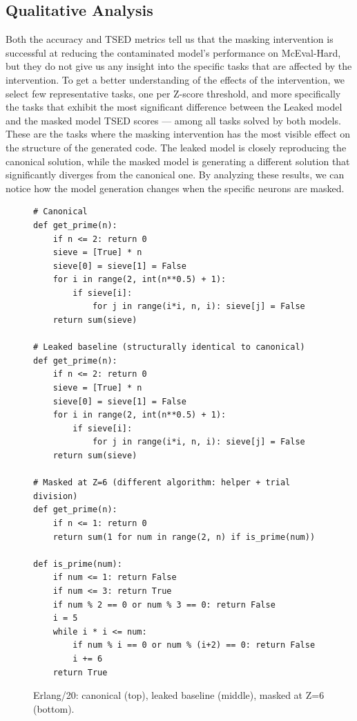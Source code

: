 \documentclass[mscthesis]{usiinfthesis}
\begin{document}
\subsection{Qualitative Analysis}
Both the accuracy and TSED metrics tell us that the masking intervention is successful
at reducing the contaminated model's performance on McEval-Hard, but they do not give us
any insight into the specific tasks that are affected by the intervention.
To get a better understanding of the effects of the intervention, we select few representative
tasks, one per Z-score threshold, and more specifically the tasks that exhibit the most significant
difference between the Leaked model and the masked model TSED scores --- among all tasks solved by both models.
These are the tasks where the masking intervention has the most visible effect on the structure of the generated code.
The leaked model is closely reproducing the canonical solution, while the masked model is
generating a different solution that significantly diverges from the canonical one.
By analyzing these results, we can notice how the model generation changes when the specific neurons
are masked.
\begin{figure}[h]
\begin{lstlisting}[style=pythonstyle2]
# Canonical
def get_prime(n):
    if n <= 2: return 0
    sieve = [True] * n
    sieve[0] = sieve[1] = False
    for i in range(2, int(n**0.5) + 1):
        if sieve[i]:
            for j in range(i*i, n, i): sieve[j] = False
    return sum(sieve)
 
# Leaked baseline (structurally identical to canonical)
def get_prime(n):
    if n <= 2: return 0
    sieve = [True] * n
    sieve[0] = sieve[1] = False
    for i in range(2, int(n**0.5) + 1):
        if sieve[i]:
            for j in range(i*i, n, i): sieve[j] = False
    return sum(sieve)
 
# Masked at Z=6 (different algorithm: helper + trial division)
def get_prime(n):
    if n <= 1: return 0
    return sum(1 for num in range(2, n) if is_prime(num))
 
def is_prime(num):
    if num <= 1: return False
    if num <= 3: return True
    if num % 2 == 0 or num % 3 == 0: return False
    i = 5
    while i * i <= num:
        if num % i == 0 or num % (i+2) == 0: return False
        i += 6
    return True
\end{lstlisting}
\caption{Erlang/20: canonical (top), leaked baseline (middle), masked at Z=6 (bottom).}
\label{fig:erlang20}
\end{figure}
\end{document}
